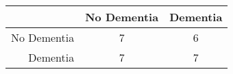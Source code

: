 \begin{table}[ht]
\centering
\begin{tabular}{r|c|c}
  \hline
 & No Dementia & Dementia \\ 
  \hline
No Dementia & 7 & 6 \\ 
  Dementia & 7 & 7 \\ 
   \hline
\end{tabular}
\end{table}
